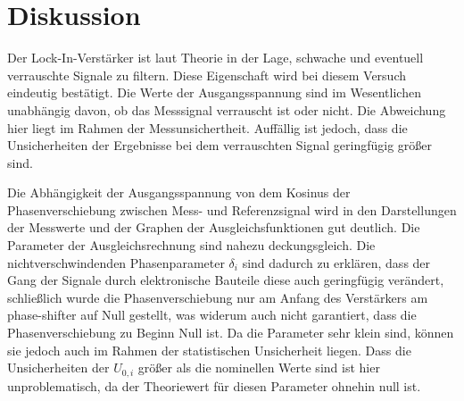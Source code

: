 \section{Diskussion}
\label{sec:Diskussion}
Der Lock-In-Verstärker ist laut Theorie in der Lage, schwache und eventuell
verrauschte Signale zu filtern. Diese Eigenschaft wird bei diesem Versuch eindeutig bestätigt.
Die Werte der Ausgangsspannung sind im Wesentlichen unabhängig davon, ob das Messsignal
verrauscht ist oder nicht. Die Abweichung hier liegt im Rahmen der Messunsichertheit.
Auffällig ist jedoch, dass die Unsicherheiten der Ergebnisse bei dem verrauschten
Signal geringfügig größer sind.

Die Abhängigkeit der Ausgangsspannung von dem Kosinus der Phasenverschiebung zwischen
Mess- und Referenzsignal wird in den Darstellungen der Messwerte und der Graphen
der Ausgleichsfunktionen gut deutlich. Die Parameter der Ausgleichsrechnung sind
nahezu deckungsgleich. Die nichtverschwindenden Phasenparameter $\delta_i$ sind
dadurch zu erklären, dass der Gang der Signale durch elektronische Bauteile diese
auch geringfügig verändert, schließlich wurde die Phasenverschiebung nur am
Anfang des Verstärkers am phase-shifter auf Null gestellt, was widerum auch nicht
garantiert, dass die Phasenverschiebung zu Beginn Null ist. Da die Parameter sehr
klein sind, können sie jedoch auch im Rahmen der statistischen Unsicherheit liegen.
Dass die Unsicherheiten der $U_{0,i}$ größer als die nominellen Werte sind ist hier unproblematisch,
da der Theoriewert für diesen Parameter ohnehin null ist.
